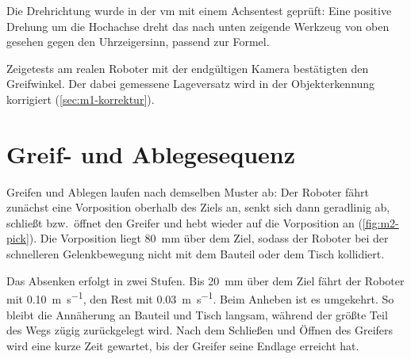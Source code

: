 Die Drehrichtung wurde in der \ac{vm} mit einem Achsentest geprüft: Eine positive Drehung um
die Hochachse dreht das nach unten zeigende Werkzeug von oben gesehen gegen den Uhrzeigersinn,
passend zur Formel.

Zeigetests am realen Roboter mit der endgültigen Kamera bestätigten den Greifwinkel. Der dabei
gemessene Lageversatz wird in der Objekterkennung korrigiert (\cref{sec:m1-korrektur}).

\section{Greif- und Ablegesequenz}
\label{sec:m2-sequenz}

Greifen und Ablegen laufen nach demselben Muster ab: Der Roboter fährt zunächst eine
Vorposition oberhalb des Ziels an, senkt sich dann geradlinig ab, schließt bzw.\ öffnet den
Greifer und hebt wieder auf die Vorposition an (\cref{fig:m2-pick}). Die Vorposition liegt
\SI{80}{\milli\metre} über dem Ziel, sodass der Roboter bei der schnelleren Gelenkbewegung
nicht mit dem Bauteil oder dem Tisch kollidiert.

Das Absenken erfolgt in zwei Stufen. Bis \SI{20}{\milli\metre} über dem Ziel fährt der
Roboter mit \SI{0.10}{\metre\per\second}, den Rest mit \SI{0.03}{\metre\per\second}. Beim
Anheben ist es umgekehrt. So bleibt die Annäherung an Bauteil und Tisch langsam, während
der größte Teil des Wegs zügig zurückgelegt wird. Nach dem Schließen und Öffnen des Greifers
wird eine kurze Zeit gewartet, bis der Greifer seine Endlage erreicht hat.

